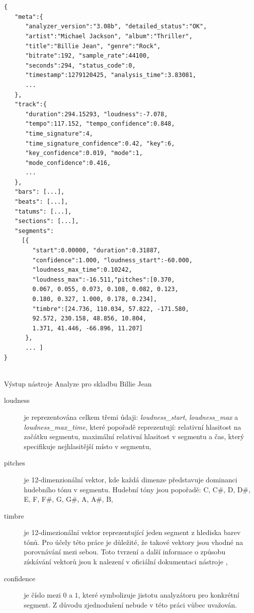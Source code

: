 \documentclass[thesis=M,czech]{FITthesis}[2012/06/26]
\begin{document}
\begin{listing}
\begin{verbatim}


{  
   "meta":{  
      "analyzer_version":"3.08b", "detailed_status":"OK",
      "artist":"Michael Jackson", "album":"Thriller",
      "title":"Billie Jean", "genre":"Rock",
      "bitrate":192, "sample_rate":44100,
      "seconds":294, "status_code":0,
      "timestamp":1279120425, "analysis_time":3.83081,
      ...
   },
   "track":{  
      "duration":294.15293, "loudness":-7.078,
      "tempo":117.152, "tempo_confidence":0.848,
      "time_signature":4,
      "time_signature_confidence":0.42, "key":6,
      "key_confidence":0.019, "mode":1,
      "mode_confidence":0.416,
      ...
   },
   "bars": [...],
   "beats": [...],
   "tatums": [...],
   "sections": [...],
   "segments":
     [{ 
        "start":0.00000, "duration":0.31887,
        "confidence":1.000, "loudness_start":-60.000,
        "loudness_max_time":0.10242,
        "loudness_max":-16.511,"pitches":[0.370,
        0.067, 0.055, 0.073, 0.108, 0.082, 0.123,
        0.180, 0.327, 1.000, 0.178, 0.234],
        "timbre":[24.736, 110.034, 57.822, -171.580,
        92.572, 230.158, 48.856, 10.804,
        1.371, 41.446, -66.896, 11.207]
      },
      ... ]
}


\end{verbatim}
\caption{Výstup nástroje Analyze pro skladbu Billie Jean} 
\label{json-example}
\end{listing}

\begin{description}
\item[loudness]

je reprezentována celkem třemi údaji: \textit{loudness\_start}, \textit{loudness\_max} a \textit{loudness\_max\_time}, které popořadě reprezentují: relativní hlasitost na začátku segmentu, maximální relativní hlasitost v segmentu a čas, který specifikuje nejhlasitější místo v segmentu,
 
\item[pitches] je 12-dimenzionální vektor, kde každá dimenze představuje dominanci hudebního tónu v segmentu. Hudební tóny jsou popořadě: C, C\#, D, D\#, E, F, F\#, G, G\#, A, A\#, B,

\item[timbre] je 12-dimezionální vektor reprezentující jeden segment z hlediska barev tónů. Pro účely této práce je důležité, že takové vektory jsou vhodné na porovnávání mezi sebou. Toto tvrzení a další informace o způsobu získávání vektorů jsou k nalezení v oficiální dokumentaci nástroje \cite{analyze},

\item[confidence] je číslo mezi $0$ a $1$, které symbolizuje jistotu analyzátoru pro konkrétní segment. Z důvodu zjednodušení nebude v této práci vůbec uvažován.
\end{description}
\end{document}
